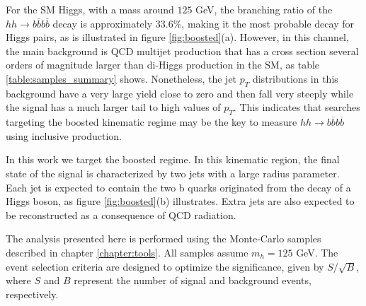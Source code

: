 %


For the SM Higgs, with a mass around $125$ GeV, the branching ratio of the $hh\rightarrow b\overline{b}b\overline{b}$ decay is approximately $33.6\%$, making it the most probable decay for Higgs pairs, as is illustrated in figure \ref{fig:boosted}(a).
However, in this channel, the main background is QCD multijet production that has a cross section several orders of magnitude larger than di-Higgs production in the SM, as table \ref{table:samples_summary} shows. Nonetheless, the jet $p_T$ distributions in this background have a very large yield close to zero and then fall very steeply while the signal has a much larger tail to high values of $p_T$. This indicates that searches targeting the boosted kinematic regime may be the key to measure $hh\rightarrow b\overline{b}b\overline{b}$ using inclusive production.

In this work we target the boosted regime. In this kinematic region, the final state of the signal is characterized by two jets with a large radius parameter. Each jet is expected to contain the two b quarks originated from the decay of a Higgs boson, as figure \ref{fig:boosted}(b) illustrates. Extra jets are also expected to be reconstructed as a consequence of QCD radiation. 

The analysis presented here is performed using the Monte-Carlo samples described in chapter \ref{chapter:tools}. All samples assume $m_h=125$ GeV. The event selection criteria are designed to optimize the significance, given by $S/\sqrt{B}$, where $S$ and $B$ represent the number of signal and background events, respectively. 

